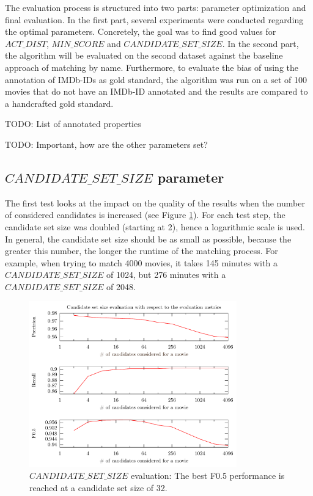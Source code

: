 The evaluation process is structured into two parts: parameter optimization and final evaluation.
In the first part, several experiments were conducted regarding the optimal parameters.
Concretely, the goal was to find good values for $ACT\_DIST$, $MIN\_SCORE$ and $CANDIDATE\_SET\_SIZE$.
In the second part, the algorithm will be evaluated on the second dataset against the baseline approach of matching by name.
Furthermore, to evaluate the bias of using the annotation of IMDb-IDs as gold standard, the algorithm was run on a set of 100 movies that do not have an IMDb-ID annotated and the results are compared to a handcrafted gold standard.

TODO: List of annotated properties

TODO: Important, how are the other parameters set?

\subsection{$CANDIDATE\_SET\_SIZE$ parameter}
The first test looks at the impact on the quality of the results when the number of considered candidates is increased (see Figure \ref{fig_candidate_set_size}).
For each test step, the candidate set size was doubled (starting at 2), hence a logarithmic scale is used.
In general, the candidate set size should be as small as possible, because the greater this number, the longer the runtime of the matching process.
For example, when trying to match 4000 movies, it takes 145 minutes with a $CANDIDATE\_SET\_SIZE$ of 1024, but 276 minutes with a $CANDIDATE\_SET\_SIZE$ of 2048.

\begin{figure}[h!]
  \begin{center}
  \includegraphics[width=0.8\textwidth]{images/candidateSetSize.pdf}
  \end{center}
  \caption{$CANDIDATE\_SET\_SIZE$ evaluation: The best F0.5 performance is reached at a candidate set size of 32.}
  \label{fig_candidate_set_size}
\end{figure}

